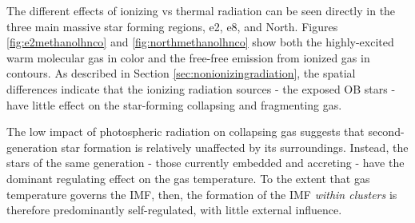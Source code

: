 \documentclass{emulateapj}
\begin{document}
The different effects of ionizing vs thermal radiation can be seen directly in
the three main massive star forming regions, e2, e8, and North.  Figures
\ref{fig:e2methanolhnco} and \ref{fig:northmethanolhnco} show both the
highly-excited warm molecular gas in color and the free-free emission from
ionized gas in contours.  As described in Section
\ref{sec:nonionizingradiation}, the spatial differences indicate that the
ionizing radiation sources - the exposed OB stars - have little effect on the
star-forming collapsing and fragmenting gas.

The low impact of photospheric radiation on collapsing gas suggests that
second-generation star formation is relatively unaffected by its surroundings.
Instead, the stars of the same generation - those currently embedded and
accreting - have the dominant regulating effect on the gas temperature.  To the
extent that gas temperature governs the IMF, then, the formation of the IMF
\emph{within clusters} is therefore predominantly self-regulated, with little
external influence.



\end{document}

